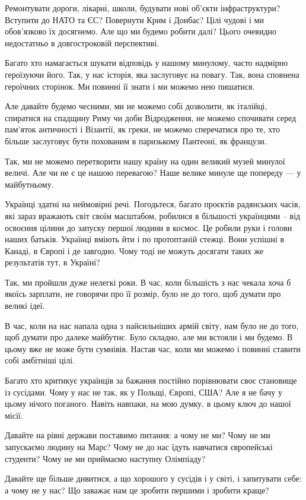 Ремонтувати дороги, лікарні, школи, будувати нові об’єкти інфраструктури?
Вступити до НАТО та ЄС? Повернути Крим і Донбас? Цілі чудові і ми обов’язково
їх досягнемо. Але що ми будемо робити далі? Цього очевидно недостатньо в
довгостроковій перспективі.

Багато хто намагається шукати відповідь у нашому минулому, часто надмірно
героїзуючи його. Так, у нас історія, яка заслуговує на повагу. Так, вона
сповнена героїчних сторінок. Ми повинні її знати і ми можемо нею пишатися. 

Але давайте будемо чесними, ми не можемо собі дозволити, як італійці, спиратися
на спадщину Риму чи доби Відродження, не можемо спочивати серед пам’яток
античності і Візантії, як греки, не можемо сперечатися про те, хто більше
заслуговує бути похованим в паризькому Пантеоні, як французи. 

Так, ми не можемо перетворити нашу країну на один великий музей минулої величі.
Але чи не є це нашою перевагою? Наше велике минуле ще попереду --- у майбутньому. 

Українці здатні на неймовірні речі. Погодьтеся, багато проєктів радянських
часів, які зараз вражають світ своїм масштабом, робилися в більшості українцями
– від освоєння цілини до запуску першої людини в космос. Це робили руки і
голови наших батьків. Українці вміють йти і по протоптаній стежці. Вони успішні
в Канаді, в Європі і де завгодно. Чому тоді не можуть досягати таких же
результатів тут, в Україні?

Так, ми пройшли дуже нелегкі роки. В час, коли більшість з нас чекала хоча б
якоїсь зарплати, не говорячи про її розмір, було не до того, щоб думати про
великі ідеї. 

В час, коли на нас напала одна з найсильніших армій світу, нам було не до того,
щоб думати про далеке майбутнє. Було складно, але ми встояли і ми будемо. В
цьому вже не може бути сумнівів. Настав час, коли ми можемо і повинні ставити
собі амбітніші цілі.

Багато хто критикує українців за бажання постійно порівнювати своє становище із сусідами. Чому у нас не так, як у Польщі, Європі, США? Але я не бачу у цьому нічого поганого. Навіть навпаки, на мою думку, в цьому ключ до нашої місії.

Давайте на рівні держави поставимо питання: а чому не ми? Чому не ми запускаємо
людину на Марс? Чому не до нас їдуть навчатися європейські студенти? Чому не ми
приймаємо наступну Олімпіаду? 

Давайте ще більше дивитися, а що хорошого у сусідів і у світі, і запитувати
себе: а чому не у нас? Що заважає нам це зробити першими і зробити краще? 

